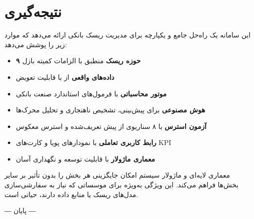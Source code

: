 \documentclass[12pt,a4paper]{article}
\newcommand{\eng}[1]{\lr{\textenglish{\textit{#1}}}}
\begin{document}
\section{نتیجه‌گیری}

این سامانه یک راه‌حل جامع و یکپارچه برای مدیریت ریسک بانکی ارائه می‌دهد که موارد زیر را پوشش می‌دهد:

\begin{itemize}[itemsep=3pt]
    \item \textbf{۹ حوزه ریسک} منطبق با الزامات کمیته بازل
    \item \textbf{داده‌های واقعی} از \eng{LendingClub} با قابلیت تعویض
    \item \textbf{موتور محاسباتی} با فرمول‌های استاندارد صنعت بانکی
    \item \textbf{هوش مصنوعی} برای پیش‌بینی، تشخیص ناهنجاری و تحلیل محرک‌ها
    \item \textbf{آزمون استرس} با ۸ سناریوی از پیش تعریف‌شده و استرس معکوس
    \item \textbf{رابط کاربری تعاملی} با نمودارهای پویا و کارت‌های KPI
    \item \textbf{معماری ماژولار} با قابلیت توسعه و نگهداری آسان
\end{itemize}

معماری لایه‌ای و ماژولار سیستم امکان جایگزینی هر بخش را بدون تأثیر بر سایر بخش‌ها فراهم می‌کند. این ویژگی به‌ویژه برای موسساتی که نیاز به سفارشی‌سازی مدل‌های ریسک یا منابع داده دارند، حیاتی است.

\vspace{1cm}
\begin{center}
{\titr\Large ― پایان ―}
\end{center}
\end{document}
